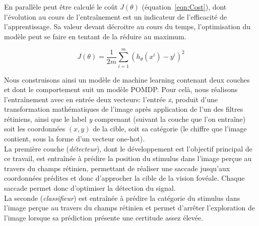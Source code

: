 En parallèle peut être calculé le coût $J(\theta)$ (équation~\ref{eqn:Cost}), dont l'évolution au cours de l'entraînement est un indicateur de l'efficacité de l'apprentissage. Sa valeur devant décroitre au cours du temps, l'optimisation du modèle peut se faire en tentant de la réduire au maximum.

\begin{equation}
J(\theta) = \frac{1}{2m} \sum_{i=1}^m (h_\theta(x^i)-y^i)^2
\label{eqn:Cost}
\end{equation}

Nous construisons ainsi un modèle de machine learning contenant deux couches et dont le comportement suit un modèle POMDP. Pour celà, nous réalisons l'entraînement avec en entrée deux vecteurs: l'entrée \textit{x}, produit d'une transformation mathématiques de l'image après application de l'un des filtres rétiniens, ainsi que le label \textit{y} comprenant (suivant la couche que l'on entraîne) soit les coordonnées $(x,y)$ de la cible, soit sa catégorie (le chiffre que l'image contient, sous la forme d'un vecteur one-hot).\\
 La première couche (\textit{détecteur}), dont le développement est l'objectif principal de ce travail, est entraînée à prédire la position du stimulus dans l'image perçue au travers du champs rétinien, permettant de réaliser une saccade jusqu'aux coordonnées prédites et donc d'approcher la cible de la vision fovéale. Chaque saccade permet donc d'optimiser la détection du signal.\autocite{Friston2012}\\
La seconde (\textit{classifieur}) est entraînée à prédire la catégorie du stimulus dans l'image perçue au travers du champs rétinien et permet d'arrêter l'exploration de l'image lorsque sa prédiction présente une certitude assez élevée.
